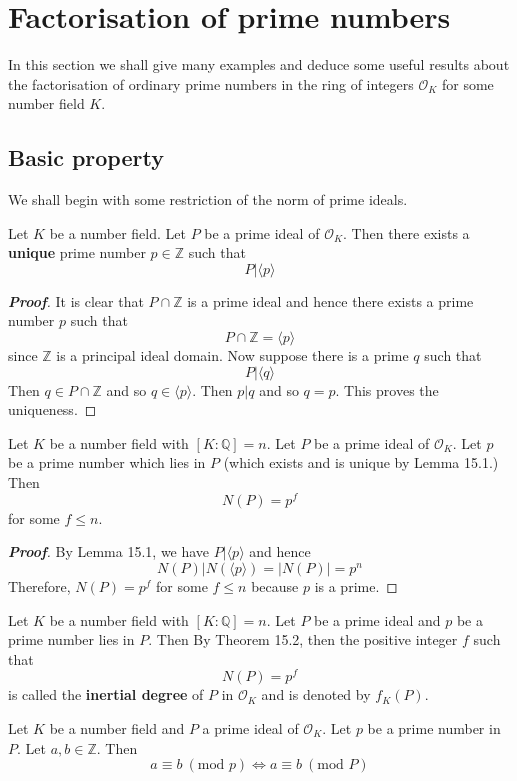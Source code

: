 \section{Factorisation of prime numbers}
In this section we shall give many examples and deduce some useful results about the factorisation of ordinary prime numbers in the ring of integers $\mathcal{O}_K$ for some number field $K$.
\subsection{Basic property}
We shall begin with some restriction of the norm of prime ideals.
\begin{lemma} Let $K$ be a number field. Let $P$ be a prime ideal of $\mathcal{O}_K$. Then there exists a {\bf unique} prime number $p \in \mathbb{Z}$ such that
$$P \big| \langle p \rangle$$
\end{lemma}
\begin{proof}[\bf Proof] It is clear that $P \cap \mathbb{Z}$ is a prime ideal and hence there exists a prime number $p$ such
that $$P \cap \mathbb{Z}=\langle p \rangle$$ since $\mathbb{Z}$ is a principal ideal domain.
Now suppose there is a prime $q$ such that $$P \big| \langle q \rangle$$
Then $q \in P \cap \mathbb{Z}$ and so $q \in \langle p \rangle$. Then $p|q$ and so $q=p$. This proves the uniqueness.
\end{proof}
\begin{theorem} Let $K$ be a number field with $[K:\mathbb{Q}]=n$. Let $P$ be a prime ideal of $\mathcal{O}_K$.
Let $p$ be a prime number which lies in $P$ (which exists and is unique by Lemma 15.1.) Then
$$N(P)=p^f$$ for some $f \le n$.
\end{theorem}
\begin{proof}[\bf Proof] By Lemma 15.1, we have  $P\big| \langle p \rangle$ and hence
$$N(P) \big| N(\langle p \rangle)=|N(P)|=p^n$$
Therefore, $N(P)=p^f$ for some $f \le n$ because $p$ is a prime.
\end{proof}
\begin{definition} Let $K$ be a number field with $[K:\mathbb{Q}]=n$. Let $P$ be a prime ideal and $p$ be a prime number lies in $P$. Then By Theorem 15.2, then the positive integer $f$ such that
$$N(P)=p^f$$
is called the {\bf inertial degree} of $P$ in $\mathcal{O}_K$ and is denoted by $f_K(P)$.
\end{definition}
\begin{proposition} Let $K$ be a number field and $P$ a prime ideal of $\mathcal{O}_K.$ Let $p$ be a prime number
in $P$. Let $a,b \in \mathbb{Z}$. Then $$a \equiv b~(\text{mod }p) \iff a \equiv b~(\text{mod }P)$$
\end{proposition}
